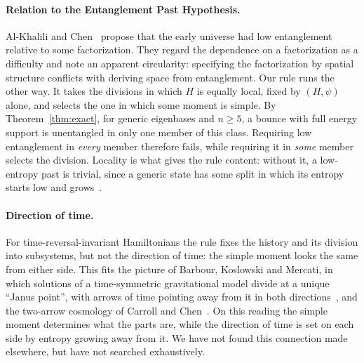 \documentclass[11pt]{article}
\theoremstyle{definition}
\theoremstyle{remark}
\begin{document}
\paragraph{Relation to the Entanglement Past Hypothesis.} Al-Khalili and Chen~\cite{AlKhaliliChen2024} propose that the early universe had low entanglement relative to some factorization. They regard the dependence on a factorization as a difficulty and note an apparent circularity: specifying the factorization by spatial structure conflicts with deriving space from entanglement. Our rule runs the other way. It takes the divisions in which $H$ is equally local, fixed by $(H,\psi)$ alone, and selects the one in which some moment is simple. By Theorem~\ref{thm:exact}, for generic eigenbases and $n\ge5$, a bounce with full energy support is unentangled in only one member of this class. Requiring low entanglement in \emph{every} member therefore fails, while requiring it in \emph{some} member selects the division. Locality is what gives the rule content: without it, a low-entropy past is trivial, since a generic state has some split in which its entropy starts low and grows~\cite{Rovelli2014}.

\paragraph{Direction of time.} For time-reversal-invariant Hamiltonians the rule fixes the history and its division into subsystems, but not the direction of time: the simple moment looks the same from either side. This fits the picture of Barbour, Koslowski and Mercati, in which solutions of a time-symmetric gravitational model divide at a unique ``Janus point'', with arrows of time pointing away from it in both directions~\cite{BKM2014}, and the two-arrow cosmology of Carroll and Chen~\cite{CarrollChen2004}. On this reading the simple moment determines what the parts are, while the direction of time is set on each side by entropy growing away from it. We have not found this connection made elsewhere, but have not searched exhaustively.
\end{document}

